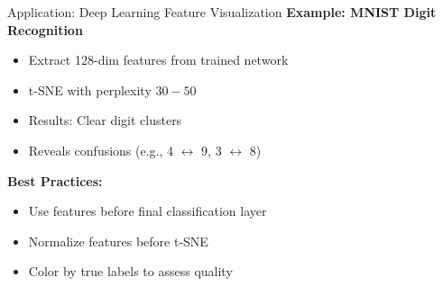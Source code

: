 \documentclass[10pt]{beamer}
\begin{document}
\begin{frame}{Application: Deep Learning Feature Visualization}
\vspace{0.2cm}
\textbf{Example: MNIST Digit Recognition}
\begin{itemize}
    \setlength\itemsep{0em}
    \item Extract 128-dim features from trained network
    \item t-SNE with perplexity $30-50$
    \item Results: Clear digit clusters
    \item Reveals confusions (e.g., 4 $\leftrightarrow$ 9, 3 $\leftrightarrow$ 8)
\end{itemize}

\vspace{0.1cm}
\textbf{Best Practices:}
\begin{itemize}
    \setlength\itemsep{0em}
    \item Use features before final classification layer
    \item Normalize features before t-SNE
    \item Color by true labels to assess quality
\end{itemize}

\end{frame}
\end{document}
